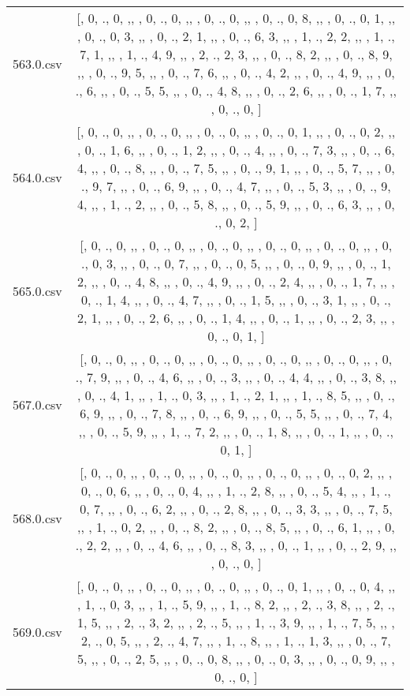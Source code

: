 \begin{table}[ht]
\begin{tabular}{@{}c c@{}}
	563.0.csv & [, 0, ., 0, ,,  , 0, ., 0, ,,  , 0, ., 0, ,,  , 0, ., 0, 8, ,,  , 0, ., 0, 1, ,,  , 0, ., 0, 3, ,,  , 0, ., 2, 1, ,,  , 0, ., 6, 3, ,,  , 1, ., 2, 2, ,,  , 1, ., 7, 1, ,,  , 1, ., 4, 9, ,,  , 2, ., 2, 3, ,,  , 0, ., 8, 2, ,,  , 0, ., 8, 9, ,,  , 0, ., 9, 5, ,,  , 0, ., 7, 6, ,,  , 0, ., 4, 2, ,,  , 0, ., 4, 9, ,,  , 0, ., 6, ,,  , 0, ., 5, 5, ,,  , 0, ., 4, 8, ,,  , 0, ., 2, 6, ,,  , 0, ., 1, 7, ,,  , 0, ., 0, ]\\ 
	564.0.csv & [, 0, ., 0, ,,  , 0, ., 0, ,,  , 0, ., 0, ,,  , 0, ., 0, 1, ,,  , 0, ., 0, 2, ,,  , 0, ., 1, 6, ,,  , 0, ., 1, 2, ,,  , 0, ., 4, ,,  , 0, ., 7, 3, ,,  , 0, ., 6, 4, ,,  , 0, ., 8, ,,  , 0, ., 7, 5, ,,  , 0, ., 9, 1, ,,  , 0, ., 5, 7, ,,  , 0, ., 9, 7, ,,  , 0, ., 6, 9, ,,  , 0, ., 4, 7, ,,  , 0, ., 5, 3, ,,  , 0, ., 9, 4, ,,  , 1, ., 2, ,,  , 0, ., 5, 8, ,,  , 0, ., 5, 9, ,,  , 0, ., 6, 3, ,,  , 0, ., 0, 2, ]\\ 
	565.0.csv & [, 0, ., 0, ,,  , 0, ., 0, ,,  , 0, ., 0, ,,  , 0, ., 0, ,,  , 0, ., 0, ,,  , 0, ., 0, 3, ,,  , 0, ., 0, 7, ,,  , 0, ., 0, 5, ,,  , 0, ., 0, 9, ,,  , 0, ., 1, 2, ,,  , 0, ., 4, 8, ,,  , 0, ., 4, 9, ,,  , 0, ., 2, 4, ,,  , 0, ., 1, 7, ,,  , 0, ., 1, 4, ,,  , 0, ., 4, 7, ,,  , 0, ., 1, 5, ,,  , 0, ., 3, 1, ,,  , 0, ., 2, 1, ,,  , 0, ., 2, 6, ,,  , 0, ., 1, 4, ,,  , 0, ., 1, ,,  , 0, ., 2, 3, ,,  , 0, ., 0, 1, ]\\ 
	567.0.csv & [, 0, ., 0, ,,  , 0, ., 0, ,,  , 0, ., 0, ,,  , 0, ., 0, ,,  , 0, ., 0, ,,  , 0, ., 7, 9, ,,  , 0, ., 4, 6, ,,  , 0, ., 3, ,,  , 0, ., 4, 4, ,,  , 0, ., 3, 8, ,,  , 0, ., 4, 1, ,,  , 1, ., 0, 3, ,,  , 1, ., 2, 1, ,,  , 1, ., 8, 5, ,,  , 0, ., 6, 9, ,,  , 0, ., 7, 8, ,,  , 0, ., 6, 9, ,,  , 0, ., 5, 5, ,,  , 0, ., 7, 4, ,,  , 0, ., 5, 9, ,,  , 1, ., 7, 2, ,,  , 0, ., 1, 8, ,,  , 0, ., 1, ,,  , 0, ., 0, 1, ]\\ 
	568.0.csv & [, 0, ., 0, ,,  , 0, ., 0, ,,  , 0, ., 0, ,,  , 0, ., 0, ,,  , 0, ., 0, 2, ,,  , 0, ., 0, 6, ,,  , 0, ., 0, 4, ,,  , 1, ., 2, 8, ,,  , 0, ., 5, 4, ,,  , 1, ., 0, 7, ,,  , 0, ., 6, 2, ,,  , 0, ., 2, 8, ,,  , 0, ., 3, 3, ,,  , 0, ., 7, 5, ,,  , 1, ., 0, 2, ,,  , 0, ., 8, 2, ,,  , 0, ., 8, 5, ,,  , 0, ., 6, 1, ,,  , 0, ., 2, 2, ,,  , 0, ., 4, 6, ,,  , 0, ., 8, 3, ,,  , 0, ., 1, ,,  , 0, ., 2, 9, ,,  , 0, ., 0, ]\\ 
	569.0.csv & [, 0, ., 0, ,,  , 0, ., 0, ,,  , 0, ., 0, ,,  , 0, ., 0, 1, ,,  , 0, ., 0, 4, ,,  , 1, ., 0, 3, ,,  , 1, ., 5, 9, ,,  , 1, ., 8, 2, ,,  , 2, ., 3, 8, ,,  , 2, ., 1, 5, ,,  , 2, ., 3, 2, ,,  , 2, ., 5, ,,  , 1, ., 3, 9, ,,  , 1, ., 7, 5, ,,  , 2, ., 0, 5, ,,  , 2, ., 4, 7, ,,  , 1, ., 8, ,,  , 1, ., 1, 3, ,,  , 0, ., 7, 5, ,,  , 0, ., 2, 5, ,,  , 0, ., 0, 8, ,,  , 0, ., 0, 3, ,,  , 0, ., 0, 9, ,,  , 0, ., 0, ]\\ 

\end{tabular}
\end{table}
